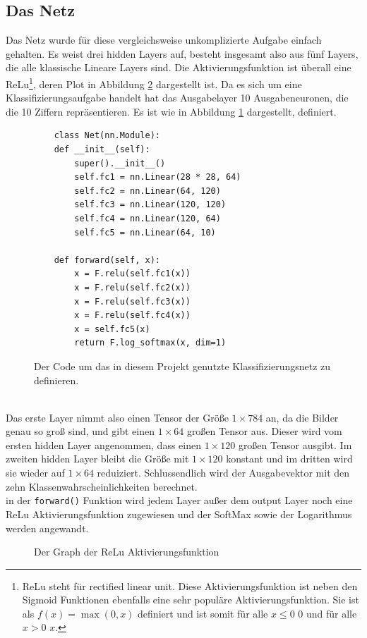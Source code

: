 \documentclass[11pt]{article}
\begin{document}
\subsection{Das Netz}\label{sec:das-netz}
Das Netz wurde für diese vergleichsweise unkomplizierte Aufgabe einfach gehalten. Es weist drei hidden Layers auf, besteht insgesamt also aus fünf Layers, die alle klassische Lineare Layers sind. Die Aktivierungsfunktion ist überall eine ReLu\footnote{ReLu steht für rectified linear unit. Diese Aktivierungsfunktion ist neben den Sigmoid Funktionen ebenfalls eine sehr populäre Aktivierungsfunktion. Sie ist als $f(x)=\max(0,x)$ definiert und ist somit für alle $x\le0$ $0$ und für alle $x>0$ $x$.}, deren Plot in Abbildung \ref{ReLu} dargestellt ist. Da es sich um eine Klassifizierungsaufgabe handelt hat das Ausgabelayer 10 Ausgabeneuronen, die die 10 Ziffern repräsentieren. Es ist wie in Abbildung \ref{net} dargestellt, definiert.
\begin{figure}[h]
 	\begin{verbatim}
	class Net(nn.Module):
	def __init__(self):
		super().__init__()
		self.fc1 = nn.Linear(28 * 28, 64)
		self.fc2 = nn.Linear(64, 120)
		self.fc3 = nn.Linear(120, 120)
		self.fc4 = nn.Linear(120, 64)
		self.fc5 = nn.Linear(64, 10)
	
	def forward(self, x):
		x = F.relu(self.fc1(x))
		x = F.relu(self.fc2(x))
		x = F.relu(self.fc3(x))
		x = F.relu(self.fc4(x))
		x = self.fc5(x)
		return F.log_softmax(x, dim=1)
	\end{verbatim}
	\caption{Der Code um das in diesem Projekt genutzte Klassifizierungsnetz zu definieren.}
	 \label{net}
\end{figure}
\\
Das erste Layer nimmt also einen Tensor der Größe $1\times 784$ an, da die Bilder genau so groß sind, und gibt einen $1\times 64$ großen Tensor aus. Dieser wird vom ersten hidden Layer angenommen, dass einen $1\times 120$ großen Tensor ausgibt. Im zweiten hidden Layer bleibt die Größe mit $1\times 120$ konstant und im dritten wird sie wieder auf $1\times 64$ reduiziert. Schlussendlich wird der Ausgabevektor mit den zehn Klassenwahrscheinlichkeiten berechnet.\\
in der \texttt{forward()} Funktion wird jedem Layer außer dem output Layer noch eine ReLu Aktivierungsfunktion zugewiesen und der SoftMax sowie der Logarithmus werden angewandt.
\begin{figure}[h]
	\begin{center}
	\end{center}
	\caption{Der Graph der ReLu Aktivierungsfunktion}
	\label{ReLu}
\end{figure}
\end{document}
